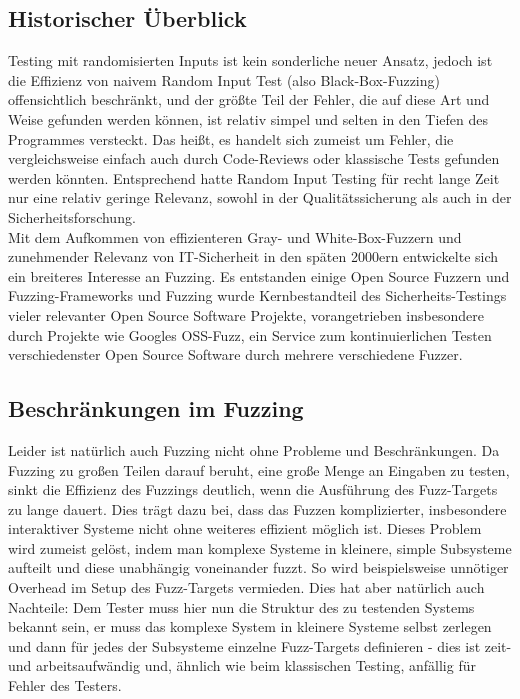 \documentclass[a4paper]{article}
\begin{document}
\subsection{Historischer Überblick}
Testing mit randomisierten Inputs ist kein sonderliche neuer Ansatz, jedoch ist die Effizienz von naivem Random Input Test (also Black-Box-Fuzzing) offensichtlich beschränkt, und der größte Teil der Fehler, die auf diese Art und Weise gefunden werden können, ist relativ simpel und selten in den Tiefen des Programmes versteckt. 
Das heißt, es handelt sich zumeist um Fehler, die vergleichsweise einfach auch durch Code-Reviews oder klassische Tests gefunden werden könnten. 
Entsprechend hatte Random Input Testing für recht lange Zeit nur eine relativ geringe Relevanz, sowohl in der Qualitätssicherung als auch in der Sicherheitsforschung.\\
Mit dem Aufkommen von effizienteren Gray- und White-Box-Fuzzern und zunehmender Relevanz von IT-Sicherheit in den späten 2000ern entwickelte sich ein breiteres Interesse an Fuzzing. Es entstanden einige Open Source Fuzzern und Fuzzing-Frameworks und Fuzzing wurde Kernbestandteil des Sicherheits-Testings vieler relevanter Open Source Software Projekte, vorangetrieben insbesondere durch Projekte wie Googles OSS-Fuzz, ein Service zum kontinuierlichen Testen verschiedenster Open Source Software durch mehrere verschiedene Fuzzer.

\subsection{Beschränkungen im Fuzzing}
Leider ist natürlich auch Fuzzing nicht ohne Probleme und Beschränkungen. 
Da Fuzzing zu großen Teilen darauf beruht, eine große Menge an Eingaben zu testen, sinkt die Effizienz des Fuzzings deutlich, wenn die Ausführung des Fuzz-Targets zu lange dauert. 
Dies trägt dazu bei, dass das Fuzzen komplizierter, insbesondere interaktiver Systeme nicht ohne weiteres effizient möglich ist. 
Dieses Problem wird zumeist gelöst, indem man komplexe Systeme in kleinere, simple Subsysteme aufteilt und diese unabhängig voneinander fuzzt. So wird beispielsweise unnötiger Overhead im Setup des Fuzz-Targets vermieden. 
Dies hat aber natürlich auch Nachteile: Dem Tester muss hier nun die Struktur des zu testenden Systems bekannt sein, er muss das komplexe System in kleinere Systeme selbst zerlegen und dann für jedes der Subsysteme einzelne Fuzz-Targets definieren - dies ist zeit- und arbeitsaufwändig und, ähnlich wie beim klassischen Testing, anfällig für Fehler des Testers. 
\end{document}
